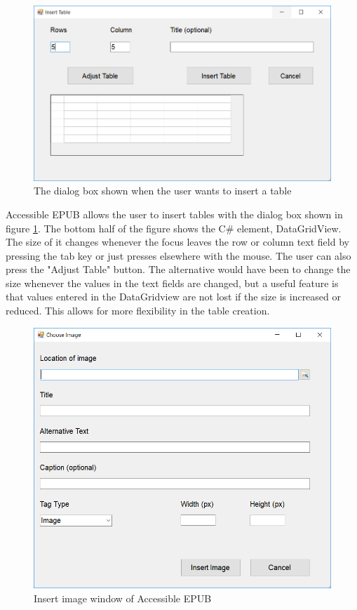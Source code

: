 \begin{figure}[h]
	\centering
	\includegraphics[width=\linewidth]{figures/TableDialogBox.png}
	\caption{The dialog box shown when the user wants to insert a table}
	\label{fig:tableDialogBox}
\end{figure}

Accessible EPUB allows the user to insert tables with the dialog box shown in figure \ref{fig:tableDialogBox}. The bottom half of the figure shows the C\# element, DataGridView. The size of it changes whenever the focus leaves the row or column text field by pressing the tab key or just presses elsewhere with the mouse. The user can also press the "Adjust Table" button. The alternative would have been to change the size whenever the values in the text fields are changed, but a useful feature is that values entered in the DataGridview are not lost if the size is increased or reduced. This allows for more flexibility in the table creation. 

\begin{figure}[h]
	\includegraphics[width=\linewidth]{figures/imageDialogBox.png}	
	\caption{Insert image window of Accessible EPUB}
	\label{fig:imageDialogBox}
\end{figure}

